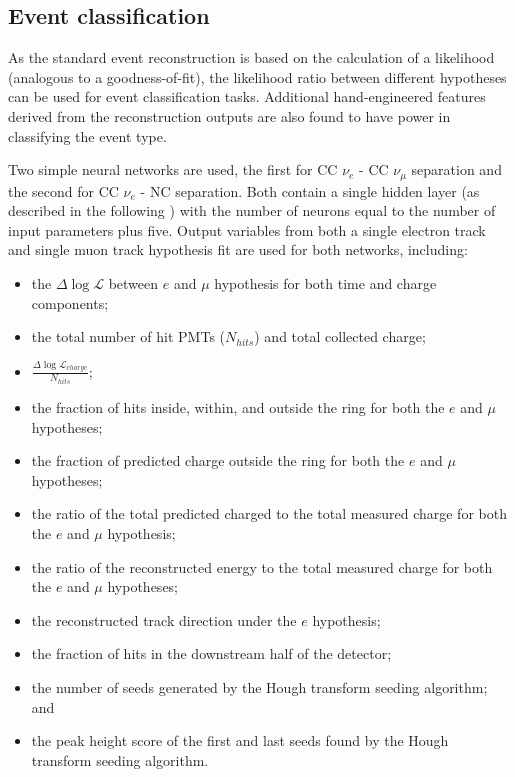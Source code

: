\subsection{Event classification}%
\label{sec:cnn_old_pid} %

As the standard event reconstruction is based on the calculation of a likelihood (analogous to a
goodness-of-fit), the likelihood ratio between different hypotheses can be used for event
classification tasks. Additional hand-engineered features derived from the reconstruction outputs
are also found to have power in classifying the event type.

Two simple neural networks are used, the first for CC $\nu_{e}$ - CC $\nu_{\mu}$ separation and
the second for CC $\nu_{e}$ - NC separation. Both contain a single hidden layer (as described in
the following ) with the number of neurons equal to the number of input
parameters plus five. Output variables from both a single electron track and single muon track
hypothesis fit are used for both networks, including:
\begin{itemize}
    \item the $\Delta\log\mathcal{L}$ between $e$ and $\mu$ hypothesis for both time and charge
          components;
    \item the total number of hit PMTs ($N_{hits}$) and total collected charge;
    \item $\frac{\Delta\log\mathcal{L}_{charge}}{N_{hits}}$;
    \item the fraction of hits inside, within, and outside the ring for both the $e$ and $\mu$
          hypotheses;
    \item the fraction of predicted charge outside the ring for both the $e$ and $\mu$ hypotheses;
    \item the ratio of the total predicted charged to the total measured charge for both the $e$
          and $\mu$ hypothesis;
    \item the ratio of the reconstructed energy to the total measured charge for both the $e$ and
          $\mu$ hypotheses;
    \item the reconstructed track direction under the $e$ hypothesis;
    \item the fraction of hits in the downstream half of the detector;
    \item the number of seeds generated by the Hough transform seeding algorithm; and
    \item the peak height score of the first and last seeds found by the Hough transform seeding
          algorithm.
\end{itemize}

